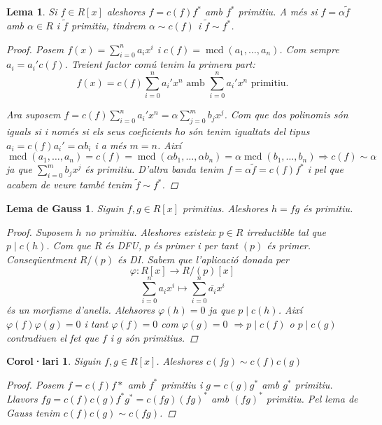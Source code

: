 \documentclass[a4paper,11pt]{report}
\DeclareMathOperator{\mcd}{mcd}
\renewcommand{\bar}{\overline}
\newcommand{\im}{\Rightarrow}
\theoremstyle{theorem}
\newtheorem{lema}{\normalfont \sffamily\bfseries Lema}[section]
\newtheorem{col}{\normalfont \sffamily\bfseries Corol·lari}[section]
\newtheorem*{lemagauss}{\normalfont\sffamily\bfseries Lema de Gauss}
\theoremstyle{definition}
\begin{document}
\begin{lema}
Si $f\in R[x]$ aleshores $f=c(f)f^*$ amb $f^*$ primitiu.
A més si $f=\alpha \tilde{f}$ amb $\alpha\in R$ i $\tilde{f}$ primitiu, tindrem $\alpha\sim c(f)$ i $\tilde{f}\sim f^*$.
\begin{proof}
	Posem $f(x)=\sum_{i=0}^{n}a_ix^i$ i $c(f)=\mcd(a_1,\ldots,a_n)$. Com sempre $a_i=a_i'c(f)$.
	Treient factor comú tenim la primera part:
	$$f(x)=c(f)\sum_{i=0}^{n}a_i'x^n \text{ amb } \sum_{i=0}^{n}a_i'x^n \text{ primitiu.}$$
	
	Ara suposem $f=c(f)\sum_{i=0}^{n}a_i'x^n =\alpha \sum_{j=0}^{m}b_jx^j$. Com que dos polinomis són iguals si i només si els seus coeficients ho són tenim igualtats del tipus $a_i=c(f)a_i'=\alpha b_i$ i a més $m=n$. Així $\mcd(a_1,\ldots,a_n)=c(f)=\mcd(\alpha b_1,\ldots,\alpha b_n)=\alpha\mcd(b_1,\ldots,b_n)\im c(f)\sim \alpha$ ja que $\sum_{i=0}^{m}b_jx^j$ és primitiu. D'altra banda tenim $f=\alpha \tilde{f}=c(f) f^*$ i pel que acabem de veure també tenim $\tilde{f} \sim f^*$.
\end{proof}
\end{lema}
\begin{lemagauss}
	Siguin $f,g\in R[x]$ primitius. Aleshores $h=fg$ és primitiu.\begin{proof}
		Suposem $h$ no primitiu. Aleshores existeix $p\in R$ irreductible tal que $p\mid c(h)$. Com que $R$ és DFU, $p$ és primer i per tant $(p)$ és primer. Conseqüentment $R/(p)$ és DI. Sabem que l'aplicació donada per $$\varphi:R[x]\longrightarrow R/(p)[x]$$
		$$\sum_{i=0}^{n}a_ix^i\longmapsto\sum_{i=0}^{n}\bar{a_i}x^i$$ és un morfisme d'anells. Alehsores $\varphi(h)=0$ ja que $p\mid c(h)$. Així $\varphi(f)\varphi(g)=0$ i tant $\varphi(f)=0$ com $\varphi(g)=0$ $\im p\mid c(f)$ o $p\mid c(g)$ contradiuen el fet que $f$ i $g$ són primitius.
	\end{proof}
\end{lemagauss}
\begin{col}
Siguin $f,g\in R[x]$. Aleshores $c(fg)\sim c(f)c(g)$
\begin{proof}
	Posem $f=c(f)f*$ amb $f^* $ primitiu i $g=c(g)g^*$ amb $g^*$ primitiu. Llavors $fg=c(f)c(g)f^* g^*=c(fg)(fg)^*$ amb $(fg)^*$ primitiu. Pel lema de Gauss tenim $c(f)c(g)\sim c(fg)$.
\end{proof}
\end{col}
\end{document}
